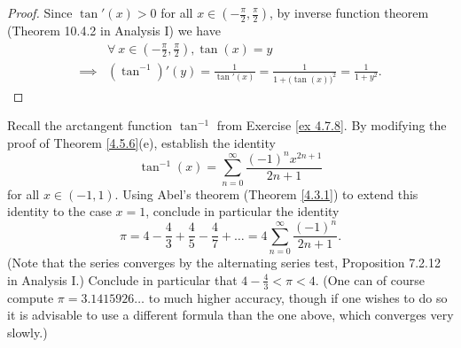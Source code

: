 \begin{proof}
    Since \(\tan'(x) > 0\) for all \(x \in (-\frac{\pi}{2}, \frac{\pi}{2})\), by inverse function theorem (Theorem 10.4.2 in Analysis I) we have
    \begin{align*}
                 & \forall\ x \in (-\frac{\pi}{2}, \frac{\pi}{2}), \tan(x) = y                                   \\
        \implies & (\tan^{-1})'(y) = \frac{1}{\tan'(x)} = \frac{1}{1 + \big(\tan(x)\big)^2} = \frac{1}{1 + y^2}.
    \end{align*}
\end{proof}

\begin{exercise}\label{ex 4.7.9}
    Recall the arctangent function \(\tan^{-1}\) from Exercise \ref{ex 4.7.8}.
    By modifying the proof of Theorem \ref{4.5.6}(e), establish the identity
    \[
        \tan^{-1}(x) = \sum_{n = 0}^\infty \frac{(-1)^n x^{2n + 1}}{2n + 1}
    \]
    for all \(x \in (-1, 1)\).
    Using Abel's theorem (Theorem \ref{4.3.1}) to extend this identity to the case \(x = 1\), conclude in particular the identity
    \[
        \pi = 4 - \frac{4}{3} + \frac{4}{5} - \frac{4}{7} + \dots = 4 \sum_{n = 0}^\infty \frac{(-1)^n}{2n + 1}.
    \]
    (Note that the series converges by the alternating series test, Proposition 7.2.12 in Analysis I.)
    Conclude in particular that \(4 - \frac{4}{3} < \pi < 4\).
    (One can of course compute \(\pi = 3.1415926 \dots\) to much higher accuracy, though if one wishes to do so it is advisable to use a different formula than the one above, which converges very slowly.)
\end{exercise}

